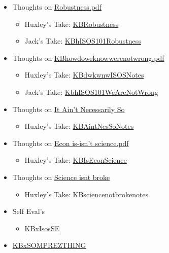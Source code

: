 \documentclass[letterpaper]{article}
\begin{document}
\begin{itemize}
\item Thoughts on \href{Robustness.pdf.org}{Robustness.pdf}

\begin{itemize}
\item Huxley's Take: \href{KBRobustness.org}{KBRobustness}
\item Jack's Take: \href{KBhISOS101Robustness.org}{KBhISOS101Robustness}
\end{itemize}

\item Thoughts on
\href{KBhowdoweknowwerenotwrong.pdf.org}{KBhowdoweknowwerenotwrong.pdf}

\begin{itemize}
\item Huxley's Take: \href{KBdwkwnwISOSNotes.org}{KBdwkwnwISOSNotes}
\item Jack's Take:
\href{KbhISOS101WeAreNotWrong.org}{KbhISOS101WeAreNotWrong}
\end{itemize}

\item Thoughts on
\href{https://www.newyorker.com/magazine/2012/09/17/it-aint-necessarily-so}{It
Ain't Necessarily So}

\begin{itemize}
\item Huxley's Take: \href{KBAintNesSoNotes.org}{KBAintNesSoNotes}
\end{itemize}

\item Thoughts on \href{Econ is-isn't science.pdf.org}{Econ is-isn't
science.pdf}

\begin{itemize}
\item Huxley's Take: \href{KBIsEconScience.org}{KBIsEconScience}
\end{itemize}

\item Thoughts on
\href{https://fivethirtyeight.com/features/science-isnt-broken/\#part4}{Science
isnt broke}

\begin{itemize}
\item Huxley's Take:
\href{KBsciencenotbrokenotes.org}{KBsciencenotbrokenotes}
\end{itemize}

\item Self Eval's

\begin{itemize}
\item \href{KBxIsosSE.org}{KBxIsosSE}
\end{itemize}

\item \href{KBxSOMPREZTHING.org}{KBxSOMPREZTHING}
\end{itemize}
\end{document}
